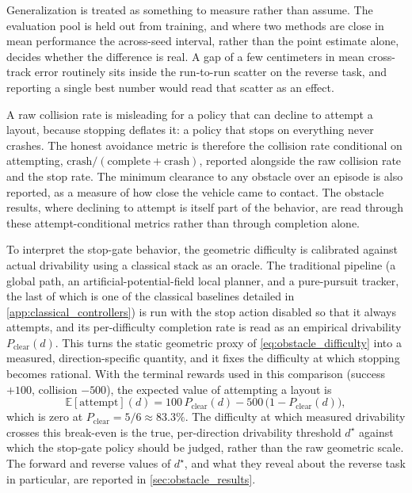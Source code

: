 Generalization is treated as something to measure rather than assume. The evaluation pool is held out from training, and where two methods are close in mean performance the across-seed interval, rather than the point estimate alone, decides whether the difference is real. A gap of a few centimeters in mean cross-track error routinely sits inside the run-to-run scatter on the reverse task, and reporting a single best number would read that scatter as an effect.

A raw collision rate is misleading for a policy that can decline to attempt a layout, because stopping deflates it: a policy that stops on everything never crashes. The honest avoidance metric is therefore the collision rate conditional on attempting, $\mathrm{crash}/(\mathrm{complete}+\mathrm{crash})$, reported alongside the raw collision rate and the stop rate. The minimum clearance to any obstacle over an episode is also reported, as a measure of how close the vehicle came to contact. The obstacle results, where declining to attempt is itself part of the behavior, are read through these attempt-conditional metrics rather than through completion alone.

To interpret the stop-gate behavior, the geometric difficulty is calibrated against actual drivability using a classical stack as an oracle. The traditional pipeline (a global path, an artificial-potential-field local planner, and a pure-pursuit tracker, the last of which is one of the classical baselines detailed in \cref{app:classical_controllers}) is run with the stop action disabled so that it always attempts, and its per-difficulty completion rate is read as an empirical drivability $P_{\mathrm{clear}}(d)$. This turns the static geometric proxy of \cref{eq:obstacle_difficulty} into a measured, direction-specific quantity, and it fixes the difficulty at which stopping becomes rational. With the terminal rewards used in this comparison (success $+100$, collision $-500$), the expected value of attempting a layout is
\begin{equation}
\mathbb{E}[\mathrm{attempt}](d) = 100\,P_{\mathrm{clear}}(d) - 500\,\bigl(1 - P_{\mathrm{clear}}(d)\bigr),
\label{eq:attempt_ev}
\end{equation}
which is zero at $P_{\mathrm{clear}} = 5/6 \approx 83.3\%$. The difficulty at which measured drivability crosses this break-even is the true, per-direction drivability threshold $d^\star$ against which the stop-gate policy should be judged, rather than the raw geometric scale. The forward and reverse values of $d^\star$, and what they reveal about the reverse task in particular, are reported in \cref{sec:obstacle_results}.

